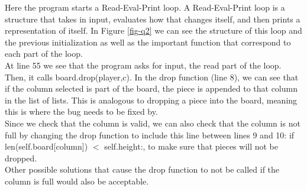 Here the program starts a Read-Eval-Print loop. A Read-Eval-Print loop is a structure that takes in input, evaluates how that changes itself, and then prints a representation of itself. In Figure \ref{fig-q2} we can see the structure of this loop and the previous initialization as well as the important function that correspond to each part of the loop.\\

At line 55 we see that the program asks for input, the read part of the loop.
Then, it calls board.drop(player,c).
In the drop function (line 8), we can see that if the column selected is part of the board,
	the piece is appended to that column in the list of lists.
This is analogous to dropping a piece into the board, meaning this is where the bug needs to be fixed by.\\

Since we check that the column is valid,
	we can also check that the column is not full by changing the drop function to include this line between lines 9 and 10:
if len(self.board[column]) $<$ self.height:, to make sure that pieces will not be dropped.\\

Other possible solutions that cause the drop function to not be called if the column is full would also be acceptable.

\newpage
